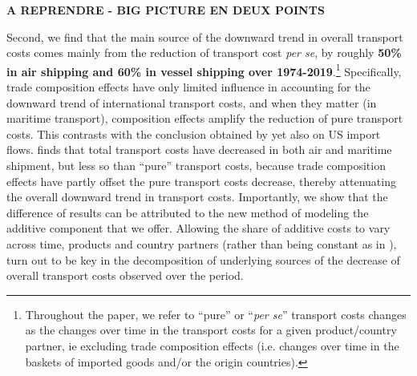 \documentclass[a4paper,11pt]{article}
\begin{document}
\textbf{A REPRENDRE - BIG PICTURE EN DEUX POINTS }

Second, we find that the main source of the downward trend in overall transport costs comes mainly from the reduction of transport cost \textit{per se}, by roughly \textbf{50\% in air shipping and 60\% in vessel shipping over 1974-2019}.\footnote{Throughout the paper, we refer to ``pure'' or ``\textit{per se}'' transport costs changes as the changes over time in the transport costs for a given product/country partner, ie excluding trade composition effects (i.e. changes over time in the baskets of imported goods and/or the origin countries).} Specifically, trade composition effects have only limited influence in accounting for the downward trend of international transport costs, and when they matter (in maritime transport), composition effects amplify the reduction of pure transport costs. This contrasts with the conclusion obtained by \cite{hummels2007} yet also on US import flows.%
\cite{hummels2007} finds that total transport costs have decreased in both air and maritime shipment, but less so than ``pure'' transport costs, because trade composition effects have partly offset the pure transport costs decrease, thereby attenuating the overall downward trend in transport costs. Importantly, we show that the difference of results can be attributed to the new method of modeling the additive component that we offer. Allowing the share of additive costs to vary across time, products and country partners (rather than being constant as in \citealp{hummels2007}), turn out to be key in the decomposition of underlying sources of the decrease of overall transport costs observed over the period.
\end{document}
